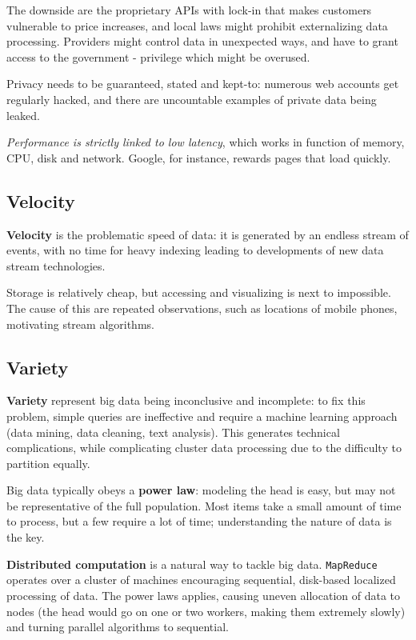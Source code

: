 The downside are the proprietary APIs with lock-in that makes customers vulnerable to price increases, and local laws might prohibit externalizing data processing. Providers might control data in unexpected ways, and have to grant access to the government - privilege which might be overused.

Privacy needs to be guaranteed, stated and kept-to: numerous web accounts get regularly hacked, and there are uncountable examples of private data being leaked. 

\textit{Performance is strictly linked to low latency}, which works in function of memory, CPU, disk and network. Google, for instance, rewards pages that load quickly. 

\subsection{Velocity}
\textbf{Velocity} is the problematic speed of data: it is generated by an endless stream of events, with no time for heavy indexing leading to developments of new data stream technologies. 

Storage is relatively cheap, but accessing and visualizing is next to impossible. The cause of this are repeated observations, such as locations of mobile phones, motivating stream algorithms. 

\subsection{Variety}
\textbf{Variety} represent big data being inconclusive and incomplete: to fix this problem, simple queries are ineffective and require a machine learning approach (data mining, data cleaning, text analysis). This generates technical complications, while complicating cluster data processing due to the difficulty to partition equally.

Big data typically obeys a \textbf{power law}: modeling the head is easy, but may not be representative of the full population. Most items take a small amount of time to process, but a few require a lot of time; understanding the nature of data is the key. 

\textbf{Distributed computation} is a natural way to tackle big data. \texttt{MapReduce} operates over a cluster of machines encouraging sequential, disk-based localized processing of data. The power laws applies, causing uneven allocation of data to nodes (the head would go on one or two workers, making them extremely slowly) and turning parallel algorithms to sequential. 

